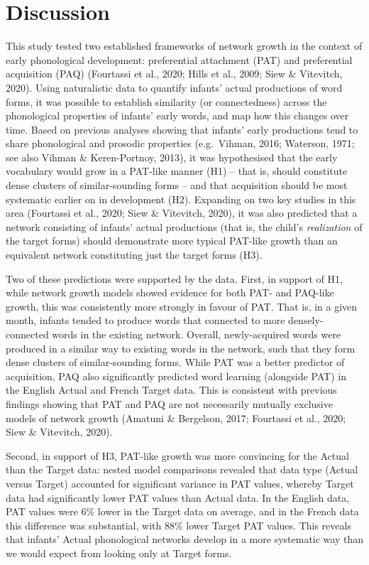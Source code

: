 \documentclass[
  english,
  man,floatsintext]{apa6}
\begin{document}
\hypertarget{discussion}{%
\section{Discussion}\label{discussion}}

This study tested two established frameworks of network growth in the context of early phonological development: preferential attachment (PAT) and preferential acquisition (PAQ) (Fourtassi et al., 2020; Hills et al., 2009; Siew \& Vitevitch, 2020). Using naturalistic data to quantify infants' actual productions of word forms, it was possible to establish similarity (or connectedness) across the phonological properties of infants' early words, and map how this changes over time. Based on previous analyses showing that infants' early productions tend to share phonological and prosodic properties (e.g.~Vihman, 2016; Waterson, 1971; see also Vihman \& Keren-Portnoy, 2013), it was hypothesised that the early vocabulary would grow in a PAT-like manner (H1) -- that is, should constitute dense clusters of similar-sounding forms -- and that acquisition should be most systematic earlier on in development (H2). Expanding on two key studies in this area (Fourtassi et al., 2020; Siew \& Vitevitch, 2020), it was also predicted that a network consisting of infants' actual productions (that is, the child's \emph{realization} of the target forms) should demonstrate more typical PAT-like growth than an equivalent network constituting just the target forms (H3).

Two of these predictions were supported by the data. First, in support of H1, while network growth models showed evidence for both PAT- and PAQ-like growth, this was consistently more strongly in favour of PAT. That is, in a given month, infants tended to produce words that connected to more densely-connected words in the existing network. Overall, newly-acquired words were produced in a similar way to existing words in the network, such that they form dense clusters of similar-sounding forms. While PAT was a better predictor of acquisition, PAQ also significantly predicted word learning (alongside PAT) in the English Actual and French Target data. This is consistent with previous findings showing that PAT and PAQ are not necessarily mutually exclusive models of network growth (Amatuni \& Bergelson, 2017; Fourtassi et al., 2020; Siew \& Vitevitch, 2020).

Second, in support of H3, PAT-like growth was more convincing for the Actual than the Target data: nested model comparisons revealed that data type (Actual versus Target) accounted for significant variance in PAT values, whereby Target data had significantly lower PAT values than Actual data. In the English data, PAT values were 6\% lower in the Target data on average, and in the French data this difference was substantial, with 88\% lower Target PAT values. This reveals that infants' Actual phonological networks develop in a more systematic way than we would expect from looking only at Target forms.
\end{document}
